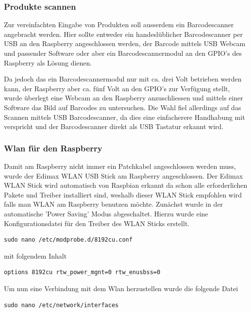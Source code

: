 \documentclass[11pt,a4paper]{article} %
\begin{document}
\subsubsection{Produkte scannen}
Zur vereinfachten Eingabe von Produkten soll ausserdem ein Barcodescanner angebracht werden. Hier sollte entweder ein handesl\"ublicher Barcodescanner per USB an den Raspberry angeschlossen werden, der Barcode mittels USB Webcam und passender Software oder aber ein Barcodescannermodul an den GPIO's des Raspberry als Lösung dienen.
\par
 Da jedoch das ein Barcodescannermodul nur mit ca. drei Volt betrieben werden kann, der Raspberry aber ca. fünf Volt an den GPIO's zur Verf\"ugung stellt, wurde überlegt eine Webcam an den Raspberry anzuschliessen und mittels einer Software das Bild auf Barcodes zu untersuchen. Die Wahl fiel allerdings auf das Scannen mittels USB Barcodescanner, da dies eine einfacherere Handhabung mit verspricht und der Barcodescanner direkt als USB Tastatur erkannt wird.
\par
\subsubsection{Wlan für den Raspberry}
Damit am Raspberry nicht immer ein Patchkabel angeschlossen werden muss, wurde der Edimax WLAN USB Stick am Raspberry angeschlossen. Der Edimax WLAN Stick wird automatisch von Raspbian erkannt da schon alle erforderlichen Pakete und Treiber installiert sind, weshalb dieser WLAN Stick empfohlen wird falls man WLAN am Raspberry benutzen m\"ochte. Zun\"achst wurde in der automatische 'Power Saving' Modus abgeschaltet. Hierzu wurde eine Konfigurationsdatei f\"ur den Treiber des WLAN Sticks erstellt.
\begin{frame}

\begin{lstlisting}
sudo nano /etc/modprobe.d/8192cu.conf
\end{lstlisting}

\end{frame}
\par

mit folgendem Inhalt
\begin{frame}

\begin{lstlisting}
options 8192cu rtw_power_mgnt=0 rtw_enusbss=0
\end{lstlisting}

\end{frame}
\par
\par
Um nun eine Verbindung mit dem Wlan herzustellen wurde die folgende Datei
\begin{frame}

\begin{lstlisting}
sudo nano /etc/network/interfaces
\end{lstlisting}

\end{frame}
\end{document}
